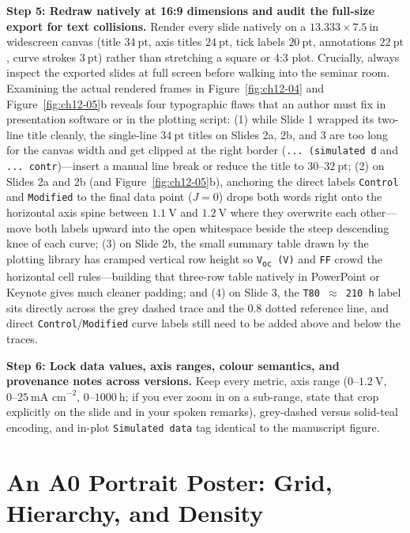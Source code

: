 \textbf{Step 5: Redraw natively at 16:9 dimensions and audit the full-size export for text collisions.} Render every slide natively on a $13.333 \times 7.5\ \text{in}$ widescreen canvas (title $34\ \text{pt}$, axis titles $24\ \text{pt}$, tick labels $20\ \text{pt}$, annotations $22\ \text{pt}$, curve strokes $3\ \text{pt}$) rather than stretching a square or 4:3 plot. Crucially, always inspect the exported slides at full screen before walking into the seminar room. Examining the actual rendered frames in Figure~\ref{fig:ch12-04} and Figure~\ref{fig:ch12-05}b reveals four typographic flaws that an author must fix in presentation software or in the plotting script: (1) while Slide 1 wrapped its two-line title cleanly, the single-line $34\ \text{pt}$ titles on Slides 2a, 2b, and 3 are too long for the canvas width and get clipped at the right border (\texttt{... (simulated d} and \texttt{... contr})---insert a manual line break or reduce the title to $30\text{--}32\ \text{pt}$; (2) on Slides 2a and 2b (and Figure~\ref{fig:ch12-05}b), anchoring the direct labels \texttt{Control} and \texttt{Modified} to the final data point ($J = 0$) drops both words right onto the horizontal axis spine between $1.1\ \text{V}$ and $1.2\ \text{V}$ where they overwrite each other---move both labels upward into the open whitespace beside the steep descending knee of each curve; (3) on Slide 2b, the small summary table drawn by the plotting library has cramped vertical row height so \texttt{V\textsubscript{oc} (V)} and \texttt{FF} crowd the horizontal cell rules---building that three-row table natively in PowerPoint or Keynote gives much cleaner padding; and (4) on Slide 3, the \texttt{T80 $\approx$ 210 h} label sits directly across the grey dashed trace and the $0.8$ dotted reference line, and direct \texttt{Control}/\texttt{Modified} curve labels still need to be added above and below the traces.

\textbf{Step 6: Lock data values, axis ranges, colour semantics, and provenance notes across versions.} Keep every metric, axis range ($0\text{--}1.2\ \text{V}$, $0\text{--}25\ \text{mA cm}^{-2}$, $0\text{--}1000\ \text{h}$; if you ever zoom in on a sub-range, state that crop explicitly on the slide and in your spoken remarks), grey-dashed versus solid-teal encoding, and in-plot \texttt{Simulated data} tag identical to the manuscript figure.

\section{An A0 Portrait Poster: Grid, Hierarchy, and Density}

